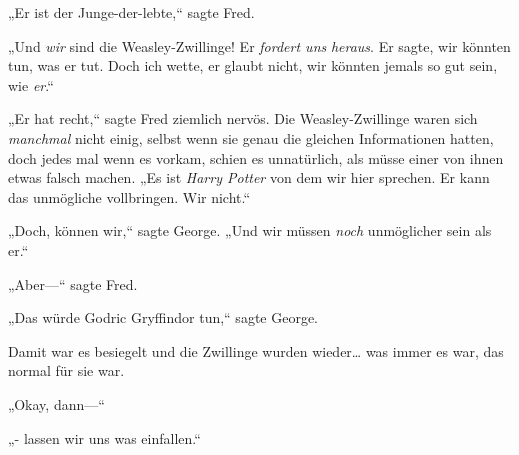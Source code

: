 „Er ist der Junge-der-lebte,“ sagte Fred.

„Und \emph{wir} sind die Weasley-Zwillinge! Er \emph{fordert uns} \emph{heraus}. Er sagte, wir könnten tun, was er tut. Doch ich wette, er glaubt nicht, wir könnten jemals so gut sein, wie \emph{er}.“

„Er hat recht,“ sagte Fred ziemlich nervös. Die Weasley-Zwillinge waren sich \emph{manchmal} nicht einig, selbst wenn sie genau die gleichen Informationen hatten, doch jedes mal wenn es vorkam, schien es unnatürlich, als müsse einer von ihnen etwas falsch machen. „Es ist \emph{Harry Potter} von dem wir hier sprechen. Er kann das unmögliche vollbringen. Wir nicht.“

„Doch, können wir,“ sagte George. „Und wir müssen \emph{noch} unmöglicher sein als er.“

„Aber—“ sagte Fred.

„Das würde Godric Gryffindor tun,“ sagte George.

Damit war es besiegelt und die Zwillinge wurden wieder… was immer es war, das normal für sie war.

„Okay, dann—“

„- lassen wir uns was einfallen.“

